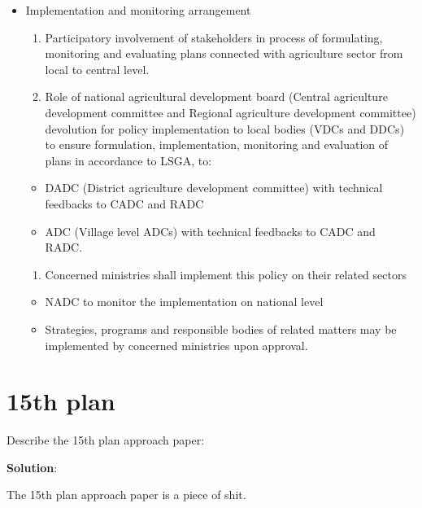 \documentclass[
  openany]{book}
\providecommand{\tightlist}{%
  \setlength{\itemsep}{0pt}\setlength{\parskip}{0pt}}
\newcommand{\question}{\item}
\newenvironment{solution}{ {\bfseries Solution}:}{}
\begin{document}
\begin{itemize}
\tightlist
\item
  Implementation and monitoring arrangement

  \begin{enumerate}
  \def\labelenumi{\arabic{enumi}.}
  \tightlist
  \item
    Participatory involvement of stakeholders in process of formulating, monitoring and evaluating plans connected with agriculture sector from local to central level.
  \item
    Role of national agricultural development board (Central agriculture development committee and Regional agriculture development committee) devolution for policy implementation to local bodies (VDCs and DDCs) to ensure formulation, implementation, monitoring and evaluation of plans in accordance to LSGA, to:
  \end{enumerate}

  \begin{itemize}
  \tightlist
  \item
    DADC (District agriculture development committee) with technical feedbacks to CADC and RADC
  \item
    ADC (Village level ADCs) with technical feedbacks to CADC and RADC.
  \end{itemize}

  \begin{enumerate}
  \def\labelenumi{\arabic{enumi}.}
  \setcounter{enumi}{2}
  \tightlist
  \item
    Concerned ministries shall implement this policy on their related sectors
  \end{enumerate}

  \begin{itemize}
  \tightlist
  \item
    NADC to monitor the implementation on national level
  \item
    Strategies, programs and responsible bodies of related matters may be implemented by concerned ministries upon approval.
  \end{itemize}
\end{itemize}

\hypertarget{th-plan}{%
\section{15th plan}\label{th-plan}}

\begin{questions}

\question Describe the 15th plan approach paper:

\begin{solution}

The 15th plan approach paper is a piece of shit.

\end{solution}

\end{questions}
\end{document}

